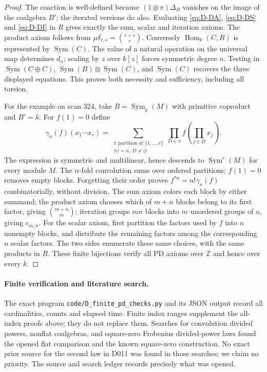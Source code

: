 \begin{proof}
The coaction is well-defined because $(1\otimes\pi)\Delta_B$
vanishes on the image of the coalgebra $B'$; the iterated versions
do also. Evaluating \eqref{eq:D-DA}, \eqref{eq:D-DS} and
\eqref{eq:D-DI} in $R$ gives exactly the sum, scalar and iteration
axioms. The product axiom follows from
$\mu\delta_{r,s}=\binom{r+s}{r}$. Conversely
$\operatorname{Hom}_k(C,R)$ is represented by
$\operatorname{Sym}(C)$. The value of a natural operation on the
universal map determines $d_n$; scaling by $z$ over $k[z]$ forces
symmetric degree $n$. Testing in
$\operatorname{Sym}(C\oplus C)$,
$\operatorname{Sym}(B)\otimes\operatorname{Sym}(C)$, and
$\operatorname{Sym}(C)$ recovers the three displayed equations.
This proves both necessity and sufficiency, including all torsion.

For the example on scan 324, take $B=\operatorname{Sym}_k(M)$
with primitive coproduct and $B'=k$. For $f(1)=0$ define
\[
 \gamma_n(f)(x_1\cdots x_r)=
 \sum_{\substack{\pi\text{ partition of }\{1,\ldots,r\}\\
                  |\pi|=n,\ D\ne\varnothing}}
       \prod_{D\in\pi}f\left(\prod_{j\in D}x_j\right).
\]
The expression is symmetric and multilinear, hence descends to
$\operatorname{Sym}^r(M)$ for every module $M$.
The $n$-fold convolution sums over ordered partitions; $f(1)=0$
removes empty blocks. Forgetting their order proves
$f^{*n}=n!\gamma_n(f)$ combinatorially, without division.
The sum axiom colors each block by either summand; the product
axiom chooses which of $m+n$ blocks belong to its first factor,
giving $\binom{m+n}{m}$; iteration groups $mn$ blocks into $m$
unordered groups of $n$, giving $c_{m,n}$. For the scalar axiom,
first partition the factors used by $f$ into $n$ nonempty blocks,
and distribute the remaining factors among the corresponding $n$
scalar factors. The two sides enumerate these same choices, with
the same products in $R$. These finite bijections verify all PD
axioms over $\mathbb Z$ and hence over every $k$.
\end{proof}

\paragraph{Finite verification and literature search.}
The exact program \nolinkurl{code/D_finite_pd_checks.py} and its
JSON output record all cardinalities, counts and elapsed time.
Finite index ranges supplement the all-index proofs above; they
do not replace them. Searches for convolution divided powers,
nonflat coalgebras, and square-zero Frobenius divided-power laws
found the opened flat comparison and the known square-zero
construction. No exact prior source for the second law in D011
was found in those searches; we claim no priority. The source and
search ledger records precisely what was opened.
